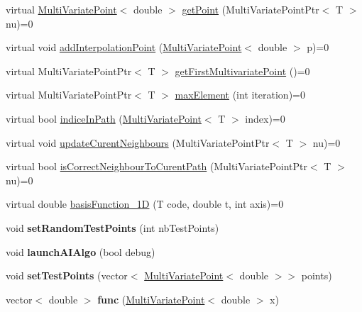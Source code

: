 \begin{DoxyCompactItemize}
\item 
virtual \hyperlink{class_multi_variate_point}{Multi\+Variate\+Point}$<$ double $>$ \hyperlink{class_interpolation_a88593453ec6ce21d53071ddd5bb52195}{get\+Point} (Multi\+Variate\+Point\+Ptr$<$ T $>$ nu)=0
\item 
virtual void \hyperlink{class_interpolation_aa2cd083f061f9c36750191da4466c665}{add\+Interpolation\+Point} (\hyperlink{class_multi_variate_point}{Multi\+Variate\+Point}$<$ double $>$ p)=0
\item 
virtual Multi\+Variate\+Point\+Ptr$<$ T $>$ \hyperlink{class_interpolation_ac478b76075519faac66590e9e0df80f5}{get\+First\+Multivariate\+Point} ()=0
\item 
virtual Multi\+Variate\+Point\+Ptr$<$ T $>$ \hyperlink{class_interpolation_a92dcf9a209d2a8046b266b59811949d4}{max\+Element} (int iteration)=0
\item 
virtual bool \hyperlink{class_interpolation_a0f2153a7dbc31a1471816a9c6c32eff1}{indice\+In\+Path} (\hyperlink{class_multi_variate_point}{Multi\+Variate\+Point}$<$ T $>$ index)=0
\item 
virtual void \hyperlink{class_interpolation_ac2e37b60de1c7b6704be643563fedd91}{update\+Curent\+Neighbours} (Multi\+Variate\+Point\+Ptr$<$ T $>$ nu)=0
\item 
virtual bool \hyperlink{class_interpolation_a3a6ee60651baf1ee8adcd4b874a71523}{is\+Correct\+Neighbour\+To\+Curent\+Path} (Multi\+Variate\+Point\+Ptr$<$ T $>$ nu)=0
\item 
virtual double \hyperlink{class_interpolation_a6a07152ada5102c8b9a9ed88fa46a418}{basis\+Function\+\_\+1D} (T code, double t, int axis)=0
\item 
void {\bfseries set\+Random\+Test\+Points} (int nb\+Test\+Points)\hypertarget{class_interpolation_a5a1e610d2baa723e12fd4c220434413d}{}\label{class_interpolation_a5a1e610d2baa723e12fd4c220434413d}

\item 
void {\bfseries launch\+A\+I\+Algo} (bool debug)\hypertarget{class_interpolation_a3ded42db23669cffb630ce1b72cb7ce6}{}\label{class_interpolation_a3ded42db23669cffb630ce1b72cb7ce6}

\item 
void {\bfseries set\+Test\+Points} (vector$<$ \hyperlink{class_multi_variate_point}{Multi\+Variate\+Point}$<$ double $>$$>$ points)\hypertarget{class_interpolation_a976978e385d7ec3ed5506f1ca96938b3}{}\label{class_interpolation_a976978e385d7ec3ed5506f1ca96938b3}

\item 
vector$<$ double $>$ {\bfseries func} (\hyperlink{class_multi_variate_point}{Multi\+Variate\+Point}$<$ double $>$ x)\hypertarget{class_interpolation_ad60e72c0836ea039de395eb93271deb7}{}\label{class_interpolation_ad60e72c0836ea039de395eb93271deb7}


\end{DoxyCompactItemize}
